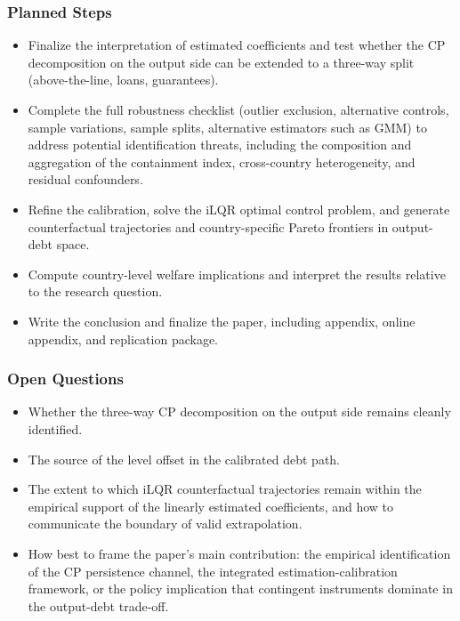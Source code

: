 \documentclass[12pt, a4paper]{article}
\begin{document}
\subsubsection{Planned Steps}
\begin{itemize}
  \item Finalize the interpretation of estimated coefficients and test whether the CP decomposition on the output side can be extended to a three-way split (above-the-line, loans, guarantees).
  \item Complete the full robustness checklist (outlier exclusion, 
alternative controls, sample variations, sample splits, 
alternative estimators such as GMM) to address potential 
identification threats, including the composition and 
aggregation of the containment index, cross-country 
heterogeneity, and residual confounders.
  \item Refine the calibration, solve the iLQR optimal control 
    problem, and generate counterfactual trajectories and 
    country-specific Pareto frontiers in output-debt space.
  \item Compute country-level welfare implications and interpret 
    the results relative to the research question.
  \item Write the conclusion and finalize the paper, including 
    appendix, online appendix, and replication package.
\end{itemize}

\subsubsection{Open Questions}
\begin{itemize}
  \item Whether the three-way CP decomposition on the output 
    side remains cleanly identified.
  \item The source of the level offset in the calibrated debt 
    path.
  \item The extent to which iLQR counterfactual trajectories 
    remain within the empirical support of the linearly estimated 
    coefficients, and how to communicate the boundary of valid 
    extrapolation.
  \item How best to frame the paper's main contribution: the 
    empirical identification of the CP persistence channel, the 
    integrated estimation-calibration framework, or the policy 
    implication that contingent instruments dominate in the 
    output-debt trade-off.
\end{itemize}
\end{document}
